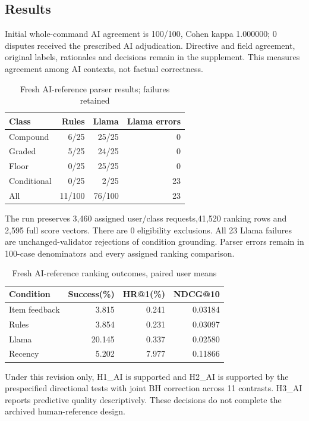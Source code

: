 \documentclass[conference]{IEEEtran}
\begin{document}
\subsection{Results}
Initial whole-command AI agreement is 100/100, Cohen kappa 1.000000; 0 disputes received the prescribed AI adjudication. Directive and field agreement, original labels, rationales and decisions remain in the supplement. This measures agreement among AI contexts, not factual correctness.

\begin{table}[t]\centering\small
\caption{Fresh AI-reference parser results; failures retained}\label{tab:aiparser}
\begin{tabular}{lrrr}\toprule
Class & Rules & Llama & Llama errors\\\midrule
Compound & 6/25 & 25/25 & 0\\
Graded & 5/25 & 24/25 & 0\\
Floor & 0/25 & 25/25 & 0\\
Conditional & 0/25 & 2/25 & 23\\
All & 11/100 & 76/100 & 23\\\bottomrule
\end{tabular}\end{table}

The run preserves 3,460 assigned user/class requests,41,520 ranking rows and 2,595 full score vectors. There are 0 eligibility exclusions. All 23 Llama failures are unchanged-validator rejections of condition grounding. Parser errors remain in 100-case denominators and every assigned ranking comparison.

\begin{table}[t]\centering\small
\caption{Fresh AI-reference ranking outcomes, paired user means}\label{tab:airank}
\begin{tabular}{lrrr}\toprule
Condition & Success(\%) & HR@1(\%) & NDCG@10\\\midrule
Item feedback & 3.815 & 0.241 & 0.03184\\
Rules & 3.854 & 0.231 & 0.03097\\
Llama & 20.145 & 0.337 & 0.02580\\
Recency & 5.202 & 7.977 & 0.11866\\
\bottomrule
\end{tabular}\end{table}

Under this revision only, H1\_AI is supported and H2\_AI is supported by the prespecified directional tests with joint BH correction across 11 contrasts. H3\_AI reports predictive quality descriptively. These decisions do not complete the archived human-reference design.
\end{document}
